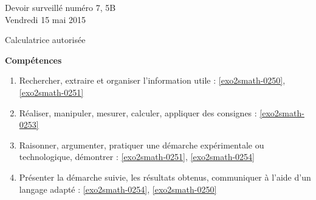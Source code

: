 \documentclass[a4paper,10pt]{article}
\begin{document}
\begin{feuilleDS}{Devoir surveillé numéro 7, 5B\\ \small Vendredi 15 mai 2015}
    \begin{center}
        Calculatrice autorisée
    \end{center}
\vspace{1cm}
{\bf Compétences}
\small
\begin{enumerate}
    \item
        Rechercher, extraire et organiser l'information utile : \ref{exo2smath-0250}, \ref{exo2smath-0251}
    \item
        Réaliser, manipuler, mesurer, calculer, appliquer des consignes : \ref{exo2smath-0253}
    \item
        Raisonner, argumenter, pratiquer une démarche expérimentale ou technologique, démontrer : \ref{exo2smath-0251}, \ref{exo2smath-0254}
    \item 
        Présenter la démarche suivie, les résultats obtenus, communiquer à l'aide d’un langage adapté : \ref{exo2smath-0254}, \ref{exo2smath-0250}
\end{enumerate}
\end{feuilleDS}
\end{document}
